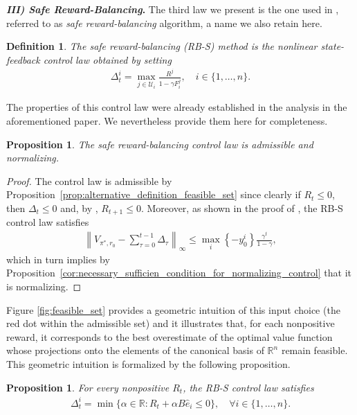 \documentclass[10pt,leqno]{amsart}
\newcommand{\norm}[1]{\left \|#1 \right \|}
\newcommand{\R}{\mathbb{R}}
\newcommand{\U}{\mathcal{U}}
\newcommand{\cost}{r}
\newcommand{\Vsym}{V}
\newcommand{\Varg}[1]{\Vsym_{#1}}
\newcommand{\Cost}{R}
\newcommand{\policy}{\pi}
\newcommand{\disc}{\gamma}
\newcommand{\infnorm}[1]{\norm{#1}_\infty}
\newtheorem{definition}[theorem]{Definition}
\newtheorem{proposition}[theorem]{Proposition}
\begin{document}
\noindent\textbf{\emph{III) Safe Reward-Balancing}.}
\newline
The third law we present is the one used in \cite[Algorithm 1]{mustafin2025mdpgeometrynormalizationreward}, referred to as \emph{safe reward-balancing} algorithm, a name we also retain here.
\begin{definition}
    The safe reward-balancing (RB-S) method is the nonlinear state-feedback control law obtained by setting
    \begin{align}\label{eq:safe_reward_balancing}
        \Delta^i_t = \max_{j \in \U_i} \frac{\Cost^j}{1 - \disc F_i^j}, \quad i \in \{1, \hdots, n\}.
    \end{align}
\end{definition}
\noindent The properties of this control law were already established in the analysis in the aforementioned paper. We nevertheless provide them here for completeness.
\begin{proposition}
    The safe reward-balancing control law is admissible and normalizing.
\end{proposition}
\begin{proof}
    The control law is admissible by Proposition~\ref{prop:alternative_definition_feasible_set} since clearly if $\Cost_t \leq 0$, then $\Delta_t \leq 0$ and, by \cite[Proposition C.1]{mustafin2025mdpgeometrynormalizationreward}, $\Cost_{t+1} \leq 0$. Moreover, as shown in the proof of \cite[Theorem 4.4]{mustafin2025mdpgeometrynormalizationreward}, the RB-S control law satisfies
    \begin{align}\label{eq:rbs_reconstructs_v_star}
        \infnorm{\Varg{\policy^*\!, \cost_0} - \sum_{\tau = 0}^{t-1} \Delta_\tau} \leq \max_i \left\{ - y_0^i \right\}\frac{\disc^t}{1 - \disc},
    \end{align}
    which in turn implies by Proposition~\ref{cor:necessary_sufficien_condition_for_normalizing_control} that it is normalizing.
\end{proof}
\noindent Figure \ref{fig:feasible_set} provides a geometric intuition of this input choice (the red dot within the admissible set) and it illustrates that, for each nonpositive reward, it corresponds to the best overestimate of the optimal value function whose projections onto the elements of the canonical basis of $\R^n$ remain feasible. This geometric intuition is formalized by the following proposition.
\begin{proposition}\label{prop:rbs_components_property}
    For every nonpositive $\Cost_t$, the RB-S control law satisfies
    \begin{align}\label{eq:constraint_rbs}
        \Delta^i_t = \min \{\alpha \in \R : \Cost_t + \alpha B \hat{e}_i \leq 0\}, \quad \forall i \in \{1, \hdots, n\}.
    \end{align}
\end{proposition}
\end{document}
